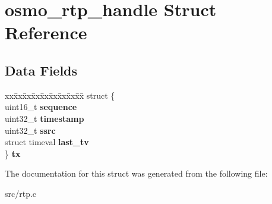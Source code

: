\section{osmo\+\_\+rtp\+\_\+handle Struct Reference}
\label{structosmo__rtp__handle}
\subsection*{Data Fields}
\begin{DoxyCompactItemize}
\item 
\begin{tabbing}
xx\=xx\=xx\=xx\=xx\=xx\=xx\=xx\=xx\=\kill
struct \{\\
\>uint16\_t {\bfseries sequence}\\
\>uint32\_t {\bfseries timestamp}\\
\>uint32\_t {\bfseries ssrc}\\
\>struct timeval {\bfseries last\_tv}\\
\} {\bfseries tx}\label{structosmo__rtp__handle_a555fc8286778174716b76c67e106cc9c}
\\

\end{tabbing}\end{DoxyCompactItemize}


The documentation for this struct was generated from the following file\+:\begin{DoxyCompactItemize}
\item 
src/rtp.\+c\end{DoxyCompactItemize}
